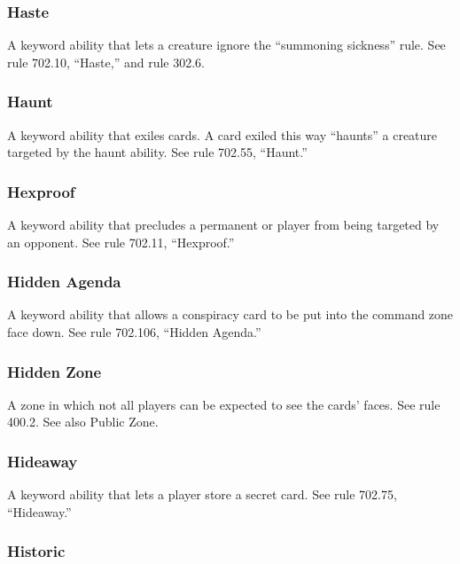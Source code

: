 {{{{{{{{{{{{{{{\subsubsection*{Haste}

A keyword ability that lets a creature ignore the “summoning sickness” rule. See rule 702.10, “Haste,” and rule 302.6.

\subsubsection*{Haunt}

A keyword ability that exiles cards. A card exiled this way “haunts” a creature targeted by the haunt ability. See rule 702.55, “Haunt.”

\subsubsection*{Hexproof}

A keyword ability that precludes a permanent or player from being targeted by an opponent. See rule 702.11, “Hexproof.”

\subsubsection*{Hidden Agenda}

A keyword ability that allows a conspiracy card to be put into the command zone face down. See rule 702.106, “Hidden Agenda.”

\subsubsection*{Hidden Zone}

A zone in which not all players can be expected to see the cards’ faces. See rule 400.2. See also Public Zone.

\subsubsection*{Hideaway}

A keyword ability that lets a player store a secret card. See rule 702.75, “Hideaway.”

\subsubsection*{Historic}

}}}}}}}}}}}}}}}

